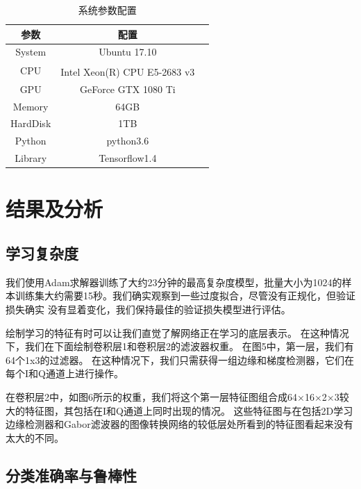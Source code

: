 \begin{table}[H]\label{sec:table_3_1}
	\centering
	\caption{系统参数配置}
	\begin{tabular}{ccc}
		\toprule
		参数 & 配置\\
		\midrule
		System & Ubuntu 17.10\\
		\midrule
		CPU & Intel\textsuperscript{\textregistered}  Xeon(R) CPU E5-2683 v3 \\
		\midrule
		GPU & GeForce GTX 1080 Ti\\
		\midrule 
		Memory & 64GB\\
		\midrule 
		HardDisk & 1TB\\
		\midrule 
		Python & python3.6\\
		\midrule 
		Library & Tensorflow1.4\\
		\bottomrule
	\end{tabular}
\end{table}

\section{结果及分析}

\subsection{学习复杂度}
我们使用Adam求解器训练了大约23分钟的最高复杂度模型，批量大小为1024的样本训练集大约需要15秒。我们确实观察到一些过度拟合，尽管没有正规化，但验证损失确实 没有显着变化，我们保持最佳的验证损失模型进行评估。\par

绘制学习的特征有时可以让我们直觉了解网络正在学习的底层表示。 在这种情况下，我们在下面绘制卷积层1和卷积层2的滤波器权重。 在图5中，第一层，我们有64个1x3的过滤器。 在这种情况下，我们只需获得一组边缘和梯度检测器，它们在每个I和Q通道上进行操作。\par

在卷积层2中，如图6所示的权重，我们将这个第一层特征图组合成64×16×2×3较大的特征图，其包括在I和Q通道上同时出现的情况。 这些特征图与在包括2D学习边缘检测器和Gabor滤波器的图像转换网络的较低层处所看到的特征图看起来没有太大的不同。\par

\subsection{分类准确率与鲁棒性}
